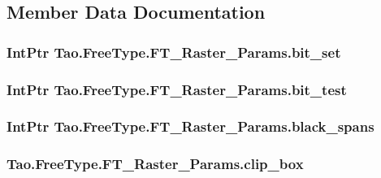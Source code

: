 \subsection{Member Data Documentation}
\hypertarget{struct_tao_1_1_free_type_1_1_f_t___raster___params_a056708c14d58a9d152af84dadb036866}{
\subsubsection[{bit\_\-set}]{\setlength{\rightskip}{0pt plus 5cm}IntPtr {\bf Tao.FreeType.FT\_\-Raster\_\-Params.bit\_\-set}}}
\label{struct_tao_1_1_free_type_1_1_f_t___raster___params_a056708c14d58a9d152af84dadb036866}
\hypertarget{struct_tao_1_1_free_type_1_1_f_t___raster___params_ad961e5db68363658b25f01c18e3f988d}{
\subsubsection[{bit\_\-test}]{\setlength{\rightskip}{0pt plus 5cm}IntPtr {\bf Tao.FreeType.FT\_\-Raster\_\-Params.bit\_\-test}}}
\label{struct_tao_1_1_free_type_1_1_f_t___raster___params_ad961e5db68363658b25f01c18e3f988d}
\hypertarget{struct_tao_1_1_free_type_1_1_f_t___raster___params_acb6dba903012fc569dd5fb8ab96fd6a5}{
\subsubsection[{black\_\-spans}]{\setlength{\rightskip}{0pt plus 5cm}IntPtr {\bf Tao.FreeType.FT\_\-Raster\_\-Params.black\_\-spans}}}
\label{struct_tao_1_1_free_type_1_1_f_t___raster___params_acb6dba903012fc569dd5fb8ab96fd6a5}
\hypertarget{struct_tao_1_1_free_type_1_1_f_t___raster___params_ac39d638ef72bf6f2d782ba42208e7d30}{
\subsubsection[{clip\_\-box}]{ {\bf Tao.FreeType.FT\_\-Raster\_\-Params.clip\_\-box}}}
